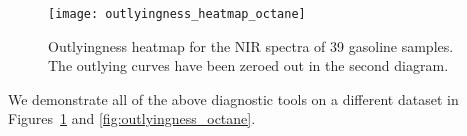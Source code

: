 \begin{figure}
    \centering
    \texttt{[image: outlyingness\_heatmap\_octane]}
    \caption{
        Outlyingness heatmap for the NIR spectra of 39 gasoline samples.
        The outlying curves have been zeroed out in the second diagram.
    }
    \label{fig:outlyingness_heatmap_octane}
\end{figure}


We demonstrate all of the above diagnostic tools on a different dataset in
Figures~\ref{fig:outlyingness_heatmap_octane} and
\ref{fig:outlyingness_octane}.
